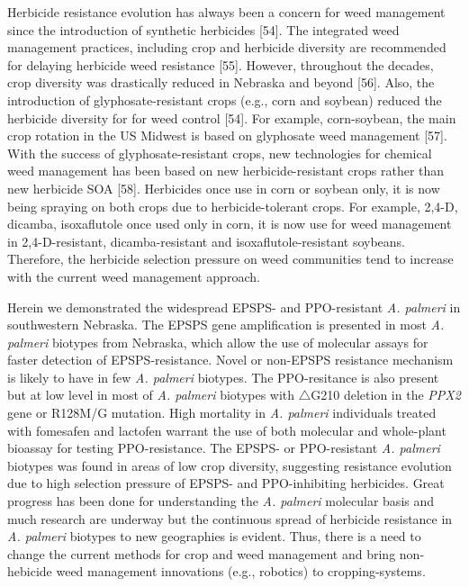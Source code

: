 \documentclass[10pt,letterpaper]{article}
\begin{document}
Herbicide resistance evolution has always been a concern for weed
management since the introduction of synthetic herbicides {[}54{]}. The
integrated weed management practices, including crop and herbicide
diversity are recommended for delaying herbicide weed resistance
{[}55{]}. However, throughout the decades, crop diversity was
drastically reduced in Nebraska and beyond {[}56{]}. Also, the
introduction of glyphosate-resistant crops (e.g., corn and soybean)
reduced the herbicide diversity for for weed control {[}54{]}. For
example, corn-soybean, the main crop rotation in the US Midwest is based
on glyphosate weed management {[}57{]}. With the success of
glyphosate-resistant crops, new technologies for chemical weed
management has been based on new herbicide-resistant crops rather than
new herbicide SOA {[}58{]}. Herbicides once use in corn or soybean only,
it is now being spraying on both crops due to herbicide-tolerant crops.
For example, 2,4-D, dicamba, isoxaflutole once used only in corn, it is
now use for weed management in 2,4-D-resistant, dicamba-resistant and
isoxaflutole-resistant soybeans. Therefore, the herbicide selection
pressure on weed communities tend to increase with the current weed
management approach.

Herein we demonstrated the widespread EPSPS- and PPO-resistant \emph{A.
palmeri} in southwestern Nebraska. The EPSPS gene amplification is
presented in most \emph{A. palmeri} biotypes from Nebraska, which allow
the use of molecular assays for faster detection of EPSPS-resistance.
Novel or non-EPSPS resistance mechanism is likely to have in few
\emph{A. palmeri} biotypes. The PPO-resitance is also present but at low
level in most of \emph{A. palmeri} biotypes with \(\triangle\)G210
deletion in the \emph{PPX2} gene or R128M/G mutation. High mortality in
\emph{A. palmeri} individuals treated with fomesafen and lactofen
warrant the use of both molecular and whole-plant bioassay for testing
PPO-resistance. The EPSPS- or PPO-resistant \emph{A. palmeri} biotypes
was found in areas of low crop diversity, suggesting resistance
evolution due to high selection pressure of EPSPS- and PPO-inhibiting
herbicides. Great progress has been done for understanding the \emph{A.
palmeri} molecular basis and much research are underway but the
continuous spread of herbicide resistance in \emph{A. palmeri} biotypes
to new geographies is evident. Thus, there is a need to change the
current methods for crop and weed management and bring non-hebicide weed
management innovations (e.g., robotics) to cropping-systems.
\end{document}
